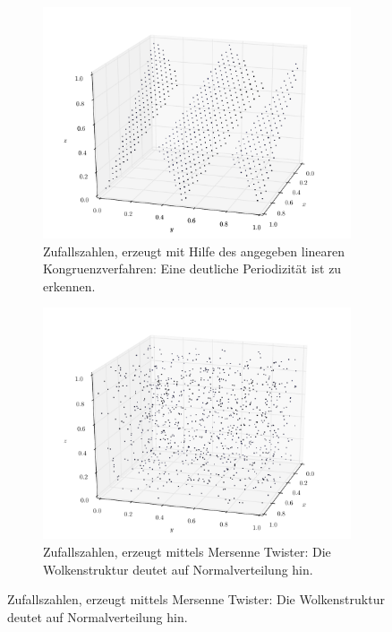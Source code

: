 \documentclass{scrartcl}
\begin{document}
\begin{figure}[H]
    \centering
    \begin{subfigure}{0.45\textwidth}
        \centering
        \includegraphics[width=\textwidth]{plots/dist3d.pdf}
        \caption{Zufallszahlen, erzeugt mit Hilfe des angegeben linearen Kongruenzverfahren: Eine deutliche Periodizität ist zu erkennen.}
        \label{fig:3DMT}
    \end{subfigure}
    \hfill
    \begin{subfigure}{0.45\textwidth}
        \centering
        \includegraphics[width=\textwidth]{plots/dist3d_mt.pdf}
        \caption{Zufallszahlen, erzeugt mittels Mersenne Twister: Die Wolkenstruktur deutet auf Normalverteilung hin.}
        \label{fig:3DLK}
    \end{subfigure}
\end{figure}
\end{document}
